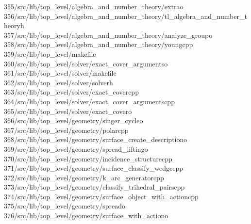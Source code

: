 \begin{tabbing}
355\>/src/lib/top\_level/algebra\_and\_number\_theory/extrao\\[0pt]
356\>/src/lib/top\_level/algebra\_and\_number\_theory/tl\_algebra\_and\_number\_theoryh\\[0pt]
357\>/src/lib/top\_level/algebra\_and\_number\_theory/analyze\_groupo\\[0pt]
358\>/src/lib/top\_level/algebra\_and\_number\_theory/youngcpp\\[0pt]
359\>/src/lib/top\_level/makefile\\[0pt]
360\>/src/lib/top\_level/solver/exact\_cover\_argumentso\\[0pt]
361\>/src/lib/top\_level/solver/makefile\\[0pt]
362\>/src/lib/top\_level/solver/solverh\\[0pt]
363\>/src/lib/top\_level/solver/exact\_covercpp\\[0pt]
364\>/src/lib/top\_level/solver/exact\_cover\_argumentscpp\\[0pt]
365\>/src/lib/top\_level/solver/exact\_covero\\[0pt]
366\>/src/lib/top\_level/geometry/singer\_cycleo\\[0pt]
367\>/src/lib/top\_level/geometry/polarcpp\\[0pt]
368\>/src/lib/top\_level/geometry/surface\_create\_descriptiono\\[0pt]
369\>/src/lib/top\_level/geometry/spread\_liftingo\\[0pt]
370\>/src/lib/top\_level/geometry/incidence\_structurecpp\\[0pt]
371\>/src/lib/top\_level/geometry/surface\_classify\_wedgecpp\\[0pt]
372\>/src/lib/top\_level/geometry/k\_arc\_generatorcpp\\[0pt]
373\>/src/lib/top\_level/geometry/classify\_trihedral\_pairscpp\\[0pt]
374\>/src/lib/top\_level/geometry/surface\_object\_with\_actioncpp\\[0pt]
375\>/src/lib/top\_level/geometry/spreado\\[0pt]
376\>/src/lib/top\_level/geometry/surface\_with\_actiono\\[0pt]

\end{tabbing}
